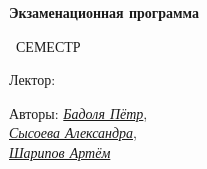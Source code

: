 \begin{titlepage}
	\clearpage\thispagestyle{empty}
	\centering
	
	\textbf{Экзаменационная программа}
	\vspace{33ex}
	
	{\textbf{\FullCourseNameFirstPart}}
	
	\SemesterNumber\ СЕМЕСТР
	\vspace{1ex}
	
	Лектор: \textit{\LecturerInitials}
	

	\begin{flushright}
		\noindent
		Авторы:
    \href{https://t.me/Postscripter}{\textit{Бадоля Пётр}}, \\
    \href{https://t.me/salexame}{\textit{Сысоева Александра}}, \\
    \href{https://t.me/ReS3D}{\textit{Шарипов Артём}}
    
	\end{flushright}
	
	\vfill
	\CourseDate
	\pagebreak
\end{titlepage}